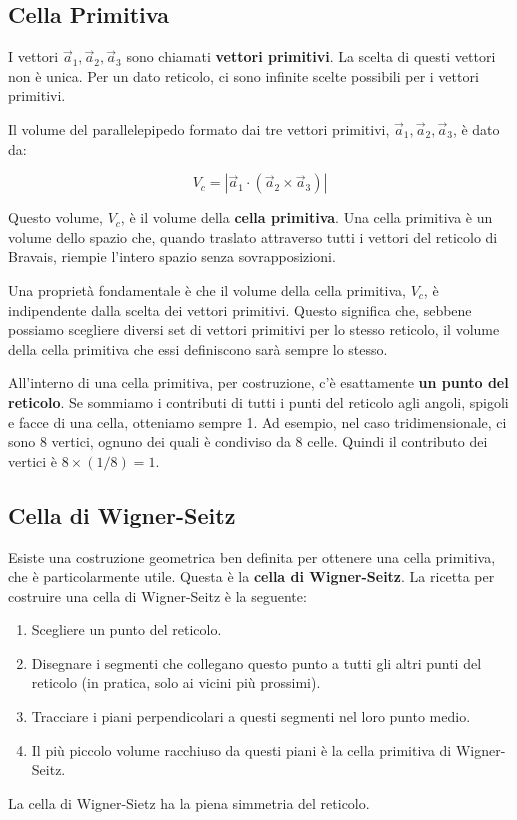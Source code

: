 \subsection{Cella Primitiva}

I vettori $\vec{a}_1, \vec{a}_2, \vec{a}_3$ sono chiamati \textbf{vettori primitivi}. La scelta di questi vettori non è unica. Per un dato reticolo, ci sono infinite scelte possibili per i vettori primitivi.

Il volume del parallelepipedo formato dai tre vettori primitivi, $\vec{a}_1, \vec{a}_2, \vec{a}_3$, è dato da:

\begin{equation}
 V_c = |\vec{a}_1 \cdot (\vec{a}_2 \times \vec{a}_3)|
\end{equation}

Questo volume, $V_c$, è il volume della \textbf{cella primitiva}. Una cella primitiva è un volume dello spazio che, quando traslato attraverso tutti i vettori del reticolo di Bravais, riempie l'intero spazio senza sovrapposizioni.

Una proprietà fondamentale è che il volume della cella primitiva, $V_c$, è indipendente dalla scelta dei vettori primitivi. Questo significa che, sebbene possiamo scegliere diversi set di vettori primitivi per lo stesso reticolo, il volume della cella primitiva che essi definiscono sarà sempre lo stesso.

All'interno di una cella primitiva, per costruzione, c'è esattamente \textbf{un punto del reticolo}. Se sommiamo i contributi di tutti i punti del reticolo agli angoli, spigoli e facce di una cella, otteniamo sempre 1. Ad esempio, nel caso tridimensionale, ci sono 8 vertici, ognuno dei quali è condiviso da 8 celle. Quindi il contributo dei vertici è $8 \times (1/8) = 1$.

\subsection{Cella di Wigner-Seitz}

Esiste una costruzione geometrica ben definita per ottenere una cella primitiva, che è particolarmente utile. Questa è la \textbf{cella di Wigner-Seitz}. La ricetta per costruire una cella di Wigner-Seitz è la seguente:
\begin{enumerate}
    \item Scegliere un punto del reticolo.
    \item Disegnare i segmenti che collegano questo punto a tutti gli altri punti del reticolo (in pratica, solo ai vicini più prossimi).
    \item Tracciare i piani perpendicolari a questi segmenti nel loro punto medio.
    \item Il più piccolo volume racchiuso da questi piani è la cella primitiva di Wigner-Seitz.
\end{enumerate}
La cella di Wigner-Sietz ha la piena simmetria del reticolo.

